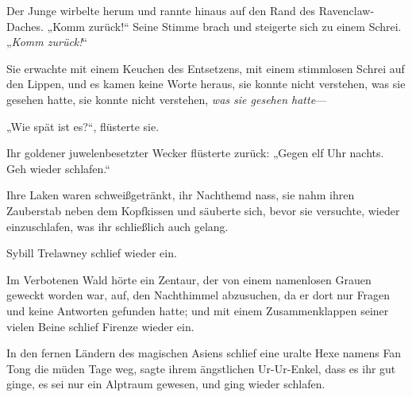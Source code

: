 Der Junge wirbelte herum und rannte hinaus auf den Rand des Ravenclaw-Daches. „Komm zurück!“ Seine Stimme brach und steigerte sich zu einem Schrei.
„\emph{Komm zurück!}“


Sie erwachte mit einem Keuchen des Entsetzens, mit einem stimmlosen Schrei auf den Lippen, und es kamen keine Worte heraus, sie konnte nicht verstehen, was sie gesehen hatte, sie konnte nicht verstehen, \emph{was sie gesehen hatte}—

„Wie spät ist es?“, flüsterte sie.

Ihr goldener juwelenbesetzter Wecker flüsterte zurück: „Gegen elf Uhr nachts. Geh wieder schlafen.“

Ihre Laken waren schweißgetränkt, ihr Nachthemd nass, sie nahm ihren Zauberstab neben dem Kopfkissen und säuberte sich, bevor sie versuchte, wieder einzuschlafen, was ihr schließlich auch gelang.

Sybill Trelawney schlief wieder ein.

\later

Im Verbotenen Wald hörte ein Zentaur, der von einem namenlosen Grauen geweckt worden war, auf, den Nachthimmel abzusuchen, da er dort nur Fragen und keine Antworten gefunden hatte; und mit einem Zusammenklappen seiner vielen Beine schlief Firenze wieder ein.

\later

In den fernen Ländern des magischen Asiens schlief eine uralte Hexe namens Fan Tong die müden Tage weg, sagte ihrem ängstlichen Ur-Ur-Enkel, dass es ihr gut ginge, es sei nur ein Alptraum gewesen, und ging wieder schlafen.


